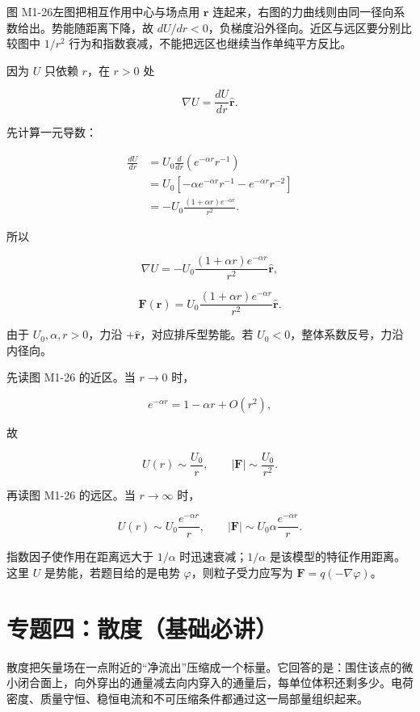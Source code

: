 图 M1-26左图把相互作用中心与场点用 \(\mathbf r\)
连起来，右图的力曲线则由同一径向系数给出。势能随距离下降，故
\(dU/dr<0\)，负梯度沿外径向。近区与远区要分别比较图中 \(1/r^2\)
行为和指数衰减，不能把远区也继续当作单纯平方反比。

因为 \(U\) 只依赖 \(r\)，在 \(r>0\) 处

\[
\nabla U=\frac{dU}{dr}\hat{\mathbf r}.
\]

先计算一元导数：

\[
\begin{aligned}
\frac{dU}{dr}
&=U_0\frac{d}{dr}\left(e^{-\alpha r}r^{-1}\right)\\
&=U_0\left[-\alpha e^{-\alpha r}r^{-1}
-e^{-\alpha r}r^{-2}\right]\\
&=-U_0\frac{(1+\alpha r)e^{-\alpha r}}{r^2}.
\end{aligned}
\]

所以

\[
\nabla U
=-U_0\frac{(1+\alpha r)e^{-\alpha r}}{r^2}
\hat{\mathbf r},
\]

\[
\boxed{
\mathbf F(\mathbf r)
=U_0\frac{(1+\alpha r)e^{-\alpha r}}{r^2}
\hat{\mathbf r}
}.
\]

由于 \(U_0,\alpha,r>0\)，力沿 \(+\hat{\mathbf r}\)，对应排斥型势能。若
\(U_0<0\)，整体系数反号，力沿内径向。

先读图 M1-26 的近区。当 \(r\to0\) 时，

\[
e^{-\alpha r}=1-\alpha r+O(r^2),
\]

故

\[
U(r)\sim\frac{U_0}{r},
\qquad
|\mathbf F|\sim\frac{U_0}{r^2}.
\]

再读图 M1-26 的远区。当 \(r\to\infty\) 时，

\[
U(r)\sim U_0\frac{e^{-\alpha r}}r,
\qquad
|\mathbf F|\sim U_0\alpha\frac{e^{-\alpha r}}r.
\]

指数因子使作用在距离远大于 \(1/\alpha\) 时迅速衰减；\(1/\alpha\)
是该模型的特征作用距离。这里 \(U\) 是势能，若题目给的是电势
\(\varphi\)，则粒子受力应写为 \(\mathbf F=q(-\nabla\varphi)\)。

\section{专题四：散度（基础必讲）}\label{m1:ux4e13ux9898ux56dbux6563ux5ea6ux57faux7840ux5fc5ux8bb2}

散度把矢量场在一点附近的``净流出''压缩成一个标量。它回答的是：围住该点的微小闭合面上，向外穿出的通量减去向内穿入的通量后，每单位体积还剩多少。电荷密度、质量守恒、稳恒电流和不可压缩条件都通过这一局部量组织起来。

